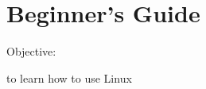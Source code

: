 \documentclass[11pt,a4paper,oneside]{book}
\begin{document}
\pagestyle{empty}



\glsaddall
\glstoctrue
\printglossaries

\cleardoublepage
\printindex


\tableofcontents

\part{Beginner's Guide}

Objective:

to learn how to use Linux

\pagestyle{fancy}








%
\end{document}
